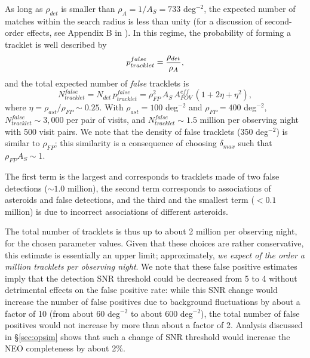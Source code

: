 As long as $\rho_{det}$ is smaller than $\rho_A = 1/A_S = 733$ deg$^{-2}$, the expected number of 
matches within the search radius is less than unity (for a discussion of second-order effects, see Appendix B 
in \citealt{IVLZ2005}). In this regime, the probability of forming a tracklet is well described by 
\begin{equation}
                 p_{tracklet}^{false} =   { \rho_{det}  \over \rho_A}, 
\end{equation}
and the total expected number of {\it false} tracklets is 
\begin{equation}
           N_{tracklet}^{false} = N_{det} \, p_{tracklet}^{false} =  \rho^2_{FP}  \, A_S \, A_{FOV}^{eff} \,
                                \left(1 + 2 \eta + \eta^2\right),
\end{equation}
where $\eta = \rho_{ast}  / \rho_{FP} \sim 0.25$. With $\rho_{ast} = 100$ deg$^{-2}$ and  $\rho_{FP} = 400$ deg$^{-2}$, 
$N_{tracklet}^{false} \sim 3,000$ per pair of visits, and $N_{tracklet}^{false} \sim 1.5$ million per observing night with 
500 visit pairs. We note that the density of false tracklets (350 deg$^{-2}$) is similar to $\rho_{FP}$; this similarity
is a consequence of choosing $\delta_{max}$ such that $\rho_{FP} A_S \sim 1$. 

The first term is the largest and corresponds to tracklets made of two false detections ($\sim1.0$ million), 
the second term corresponds to associations of asteroids and false detections, and the third and the smallest term 
($<0.1$ million) is due to incorrect associations of different asteroids.

The total number of tracklets is thus up to about 2 million per observing night, for the chosen parameter 
values. Given that these choices are rather conservative, this estimate is essentially an upper limit; approximately, 
{\it we expect of the order a million tracklets per observing night}. We note that these false positive estimates imply that
the detection SNR threshold could be decreased from 5 to 4 without detrimental effects on the false positive rate:
while this SNR change would increase the number of false positives due to background fluctuations by about a factor of 10
(from about 60 deg$^{-2}$ to about 600 deg$^{-2}$), the total number of false positives would not increase by more
than about a  factor of 2.  Analysis discussed in \S\ref{sec:opsim} shows that such a change of SNR threshold would increase 
the NEO completeness by  about 2\%. 

